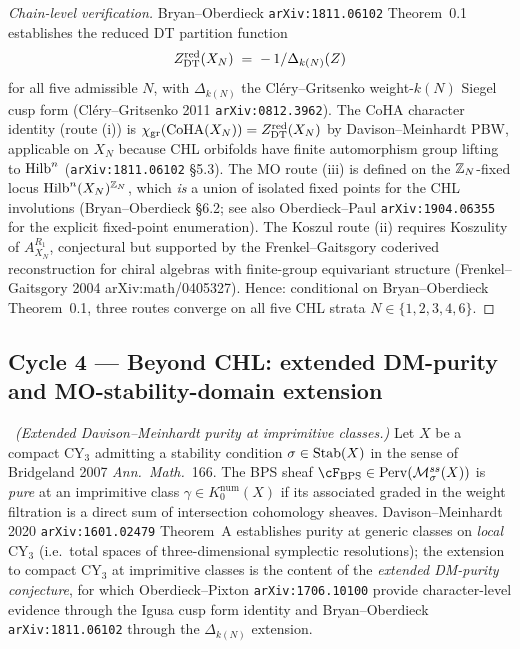 \begin{proof}[Chain-level verification]
Bryan--Oberdieck \texttt{arXiv:1811.06102} Theorem~0.1 establishes
the reduced DT partition function
\[
  Z^{\mathrm{red}}_{\mathrm{DT}}(X_N) \;=\; -\,1/\Delta_{k(N)}(Z)
\]
for all five admissible $N$, with $\Delta_{k(N)}$ the
Cl\'ery--Gritsenko weight-$k(N)$ Siegel cusp form
(Cl\'ery--Gritsenko 2011 \texttt{arXiv:0812.3962}). The CoHA
character identity (route (i)) is
$\chi_{\mathrm{gr}}(\mathrm{CoHA}(X_N)) = Z^{\mathrm{red}}_{\mathrm{DT}}(X_N)$
by Davison--Meinhardt PBW, applicable on $X_N$ because CHL
orbifolds have finite automorphism group lifting to $\mathrm{Hilb}^n$
(\texttt{arXiv:1811.06102} \S5.3). The MO route (iii) is defined
on the $\mathbb{Z}_N$-fixed locus $\mathrm{Hilb}^n(X_N)^{\mathbb{Z}_N}$, which \emph{is}
a union of isolated fixed points for the CHL involutions
(Bryan--Oberdieck \S6.2; see also Oberdieck--Paul
\texttt{arXiv:1904.06355} for the explicit fixed-point
enumeration). The Koszul route (ii) requires Koszulity of
$A_{X_N}^{R_1}$, conjectural but supported by the
Frenkel--Gaitsgory coderived reconstruction for chiral algebras
with finite-group equivariant structure
(Frenkel--Gaitsgory 2004 arXiv:math/0405327).
Hence: conditional on Bryan--Oberdieck Theorem~0.1, three routes
converge on all five CHL strata $N \in \{1, 2, 3, 4, 6\}$.
\end{proof}

\subsection{Cycle 4 --- Beyond CHL: extended DM-purity and
MO-stability-domain extension}

\ClaimStatusConjectured\ \emph{(Extended Davison--Meinhardt purity
at imprimitive classes.)} Let $X$ be a compact CY$_3$ admitting a
stability condition $\sigma \in \mathrm{Stab}(X)$ in the sense of
Bridgeland 2007 \emph{Ann.\ Math.}\ 166. The BPS sheaf
$\cF_{\BPS} \in \mathrm{Perv}(\cM^{ss}_\sigma(X))$ is \emph{pure}
at an imprimitive class $\gamma \in K^{\mathrm{num}}_0(X)$
if its associated graded in the weight filtration is a direct sum
of intersection cohomology sheaves. Davison--Meinhardt 2020
\texttt{arXiv:1601.02479} Theorem~A establishes purity at
generic classes on \emph{local} CY$_3$ (i.e.\ total spaces of
three-dimensional symplectic resolutions); the extension to compact
CY$_3$ at imprimitive classes is the content of the \emph{extended
DM-purity conjecture}, for which Oberdieck--Pixton
\texttt{arXiv:1706.10100} provide character-level evidence through
the Igusa cusp form identity and Bryan--Oberdieck
\texttt{arXiv:1811.06102} through the $\Delta_{k(N)}$ extension.

